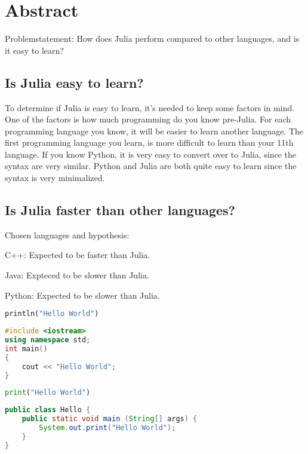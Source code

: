 \documentclass[a4paper,11pt]{article}
\begin{document}
\section*{Abstract}
Problemstatement:
How does Julia perform compared to other languages, and is it easy to learn?

\subsection*{Is Julia easy to learn?}
To determine if Julia is easy to learn, it's needed to keep some factors in mind. One of the factors is how much programming do you know pre-Julia. For each programming language you know, it will be easier to learn another language. The first programming language you learn, is more difficult to learn than your 11th language. If you know Python, it is very easy to convert over to Julia, since the syntax are very similar. Python and Julia are both quite easy to learn since the syntax is very minimalized.

\subsection*{Is Julia faster than other languages?}
Chosen languages and hypothesis:
\begin{list}{}{}
	\item C++: Expected to be faster than Julia.
	\item Java: Expteced to be slower than Julia.
	\item Python: Expected to be slower than Julia.
\end{list}
\begin{multicols}{2}
\begin{lstlisting}[caption=Hello World in Julia, language=Python]
println("Hello World")
\end{lstlisting}

\begin{lstlisting}[caption=Hello World in C++, language=C++]
#include <iostream>
using namespace std; 
int main()
{
	cout << "Hello World";
}
\end{lstlisting}
\begin{lstlisting}[caption=Hello World in Python, language=Python]
print("Hello World")
\end{lstlisting}
\begin{lstlisting}[caption=Hello World in Java, language=Java]
public class Hello {
	public static void main (String[] args) {
		System.out.print("Hello World");
	}
}
\end{lstlisting}
\end{multicols}
\end{document}

